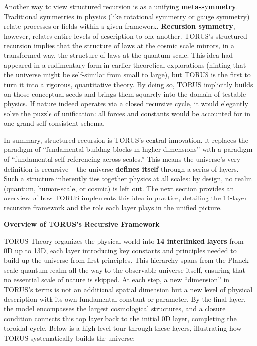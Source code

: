 \documentclass[
]{article}
\begin{document}
Another way to view structured recursion is as a unifying
\textbf{meta-symmetry}. Traditional symmetries in physics (like
rotational symmetry or gauge symmetry) relate processes or fields within
a given framework. \textbf{Recursion symmetry}, however, relates entire
levels of description to one another. TORUS's structured recursion
implies that the structure of laws at the cosmic scale mirrors, in a
transformed way, the structure of laws at the quantum scale. This idea
had appeared in a rudimentary form in earlier theoretical explorations
(hinting that the universe might be self-similar from small to large),
but TORUS is the first to turn it into a rigorous, quantitative theory.
By doing so, TORUS implicitly builds on those conceptual seeds and
brings them squarely into the domain of testable physics. If nature
indeed operates via a closed recursive cycle, it would elegantly solve
the puzzle of unification: all forces and constants would be accounted
for in one grand self-consistent schema.

In summary, structured recursion is TORUS's central innovation. It
replaces the paradigm of ``fundamental building blocks in higher
dimensions'' with a paradigm of ``fundamental self-referencing across
scales.'' This means the universe's very definition is recursive -- the
universe \textbf{defines itself} through a series of layers. Such a
structure inherently ties together physics at all scales: by design, no
realm (quantum, human-scale, or cosmic) is left out. The next section
provides an overview of how TORUS implements this idea in practice,
detailing the 14-layer recursive framework and the role each layer plays
in the unified picture.

\textbf{Overview of TORUS's Recursive Framework}

TORUS Theory organizes the physical world into \textbf{14 interlinked
layers} from 0D up to 13D, each layer introducing key constants and
principles needed to build up the universe from first principles. This
hierarchy spans from the Planck-scale quantum realm all the way to the
observable universe itself, ensuring that no essential scale of nature
is skipped. At each step, a new ``dimension'' in TORUS's terms is not an
additional spatial dimension but a new level of physical description
with its own fundamental constant or parameter. By the final layer, the
model encompasses the largest cosmological structures, and a closure
condition connects this top layer back to the initial 0D layer,
completing the toroidal cycle. Below is a high-level tour through these
layers, illustrating how TORUS systematically builds the universe:
\end{document}
